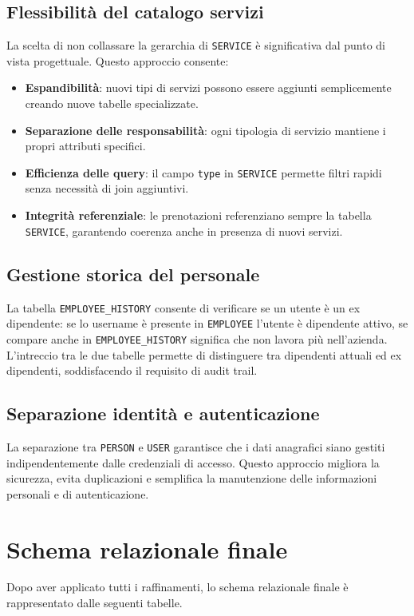 \documentclass[a4paper,12pt]{report}
\begin{document}
\subsection*{Flessibilità del catalogo servizi}
La scelta di non collassare la gerarchia di \texttt{SERVICE} è
significativa dal punto di vista progettuale. Questo approccio consente:

\begin{itemize}
  \item \textbf{Espandibilità}: nuovi tipi di servizi possono essere
    aggiunti semplicemente creando nuove tabelle specializzate.
  \item \textbf{Separazione delle responsabilità}: ogni tipologia di
    servizio mantiene i propri attributi specifici.
  \item \textbf{Efficienza delle query}: il campo \texttt{type} in
    \texttt{SERVICE} permette filtri rapidi senza necessità di join aggiuntivi.
  \item \textbf{Integrità referenziale}: le prenotazioni referenziano
    sempre la tabella \texttt{SERVICE}, garantendo coerenza anche in
    presenza di nuovi servizi.
\end{itemize}

\subsection*{Gestione storica del personale}
La tabella \texttt{EMPLOYEE\_HISTORY} consente di verificare se un
utente è un ex dipendente: se lo username è presente in
\texttt{EMPLOYEE} l'utente è dipendente attivo, se compare anche in
\texttt{EMPLOYEE\_HISTORY} significa che non lavora più nell'azienda.
L'intreccio tra le due tabelle permette di distinguere tra dipendenti
attuali ed ex dipendenti, soddisfacendo il requisito di audit trail.

\subsection*{Separazione identità e autenticazione}
La separazione tra \texttt{PERSON} e \texttt{USER} garantisce che i
dati anagrafici siano gestiti indipendentemente dalle credenziali di
accesso. Questo approccio migliora la sicurezza, evita duplicazioni e
semplifica la manutenzione delle informazioni personali e di autenticazione.

\section{Schema relazionale finale}
Dopo aver applicato tutti i raffinamenti, lo schema relazionale
finale è rappresentato dalle seguenti tabelle.
\end{document}
